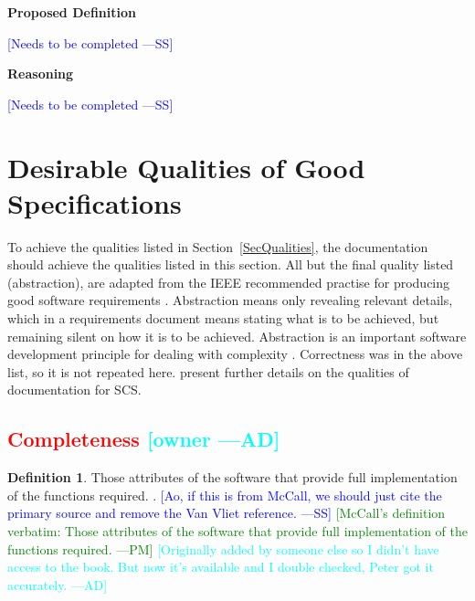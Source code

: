 \documentclass[letterpaper, cleveref]{lipics-v2019}
\newcommand{\authornote}[3]{\textcolor{#1}{[#3 ---#2]}}
\newcommand{\authornote}[3]{}
\newcommand{\wss}[1]{\authornote{blue}{SS}{#1}} %
\newcommand{\pmi}[1]{\authornote{green}{PM}{#1}} %
\newcommand{\ad}[1]{\authornote{cyan}{AD}{#1}} %
\newcommand{\notdone}[1]{\textcolor{red}{#1}}
\theoremstyle{definition}
\newtheorem{defn}{Definition}
\begin{document}
\noindent \textbf{Proposed Definition} 

\wss{Needs to be completed}

\noindent \textbf{Reasoning}

\wss{Needs to be completed}

\section{Desirable Qualities of Good Specifications} \label{SecDesirableQs}

To achieve the qualities listed in Section~\ref{SecQualities}, the
documentation should achieve the qualities listed in this section.  All but
the final quality listed (abstraction), are adapted from the IEEE
recommended practise for producing good software requirements
\citep{IEEE1998}.  Abstraction means only revealing relevant details, which
in a requirements document means stating what is to be achieved, but
remaining silent on how it is to be achieved. Abstraction is an important
software development principle for dealing with complexity \citep[p
.~40]{GhezziEtAl2003}.  Correctness was in the above list, so it is not
repeated here.  \citet{SmithAndKoothoor2016} present further details on the
qualities of documentation for SCS.


\subsection{\notdone{Completeness} \ad{owner}}

\begin{defn}
  Those attributes of the software that provide full implementation of the
  functions required. \citep{McCallEtAl1977}. \wss{Ao, if this is from McCall,
  we should just cite the primary source and remove the Van Vliet reference.}
  \pmi{McCall's definition verbatim: Those attributes of the software that
  provide full implementation of the functions required.} \ad{Originally added
  by someone else so I didn't have access to the book. But now it's available
  and I double checked, Peter got it accurately.}
\end{defn}
\end{document}
